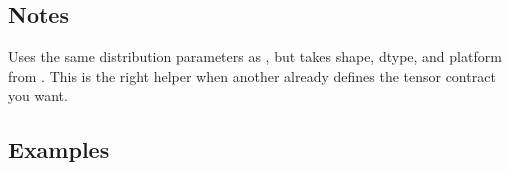 \documentclass[letterpaper,10pt,english]{sphinxmanual}
\begin{document}
\subsection{Notes}
\label{\detokenize{api_reference:id5}}
\sphinxAtStartPar
Uses the same distribution parameters as , but takes shape, dtype, and platform from . This is the right helper when another  already defines the tensor contract you want.


\subsection{Examples}
\label{\detokenize{api_reference:id6}}
\begin{sphinxVerbatim}[commandchars=\\\{\}]

\end{sphinxVerbatim}


\section{}
\label{\detokenize{api_reference:pdf}}
\end{document}
